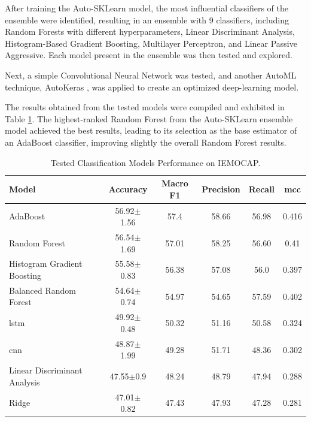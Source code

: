 After training the Auto-SKLearn model, the most influential classifiers of the ensemble were identified, resulting in an ensemble with 9 classifiers, including Random Forests with different hyperparameters, Linear Discriminant Analysis, Histogram-Based Gradient Boosting, Multilayer Perceptron, and Linear Passive Aggressive. Each model present in the ensemble was then tested and explored.

Next, a simple Convolutional Neural Network was tested, and another AutoML technique, AutoKeras \cite{jin2019auto}, was applied to create an optimized deep-learning model.

The results obtained from the tested models were compiled and exhibited in Table \ref{tab:models}. The highest-ranked Random Forest from the Auto-SKLearn ensemble model achieved the best results, leading to its selection as the base estimator of an AdaBoost classifier, improving slightly the overall Random Forest results.

\begin{table}[H]
	\centering
	\caption{Tested Classification Models Performance on IEMOCAP.}
	\label{tab:models}
	\begin{tabular}{lccccc}
		\toprule
		Model & Accuracy & Macro F1 & Precision & Recall & \ac{mcc} \\
		\midrule
		
		AdaBoost & 56.92$\pm$1.56 & 57.4 & 58.66 & 56.98 & 0.416 \\
		
		Random Forest & 56.54$\pm$1.69 & 57.01 & 58.25 & 56.60 & 0.41 \\
		
		Histogram Gradient Boosting & 55.58$\pm$0.83 & 56.38 & 57.08 & 56.0 &  0.397 \\
		
		Balanced Random Forest & 54.64$\pm$0.74 & 54.97 & 54.65 & 57.59 & 0.402 \\
		
		\ac{lstm} & 49.92$\pm$0.48 & 50.32 & 51.16 & 50.58 & 0.324 \\
		
		\ac{cnn} & 48.87$\pm$1.99 & 49.28  & 51.71 & 48.36 & 0.302 \\
		
		Linear Discriminant Analysis & 47.55$\pm$0.9 & 48.24 & 48.79& 47.94 & 0.288 \\
		
		Ridge & 47.01$\pm$0.82 & 47.43 & 47.93 & 47.28 & 0.281 \\
		
		\bottomrule
	\end{tabular}
\end{table}



